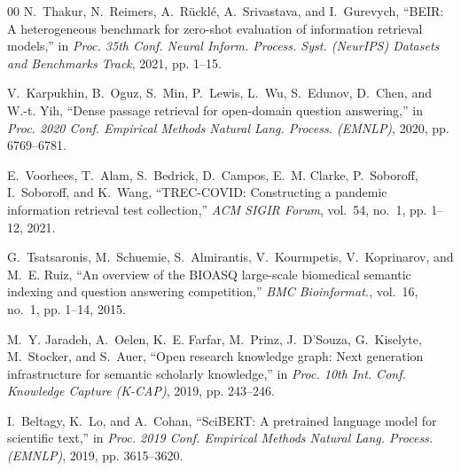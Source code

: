 \documentclass[conference]{IEEEtran}
\begin{document}
\begin{thebibliography}{00}
N.~Thakur, N.~Reimers, A.~R{\"{u}}ckl{\'{e}}, A.~Srivastava, and I.~Gurevych, ``BEIR: A heterogeneous benchmark for zero-shot evaluation of information retrieval models,'' in \emph{Proc. 35th Conf. Neural Inform. Process. Syst. (NeurIPS) Datasets and Benchmarks Track}, 2021, pp. 1--15.

V.~Karpukhin, B.~Oguz, S.~Min, P.~Lewis, L.~Wu, S.~Edunov, D.~Chen, and W.-t. Yih, ``Dense passage retrieval for open-domain question answering,'' in \emph{Proc. 2020 Conf. Empirical Methods Natural Lang. Process. (EMNLP)}, 2020, pp. 6769--6781.

E.~Voorhees, T.~Alam, S.~Bedrick, D.~Campos, E.~M. Clarke, P.~Soboroff, I.~Soboroff, and K.~Wang, ``TREC-COVID: Constructing a pandemic information retrieval test collection,'' \emph{ACM SIGIR Forum}, vol.~54, no.~1, pp. 1--12, 2021.

G.~Tsatsaronis, M.~Schuemie, S.~Almirantis, V.~Kourmpetis, V.~Koprinarov, and M.~E. Ruiz, ``An overview of the BIOASQ large-scale biomedical semantic indexing and question answering competition,'' \emph{BMC Bioinformat.}, vol.~16, no.~1, pp. 1--14, 2015.

M.~Y. Jaradeh, A.~Oelen, K.~E. Farfar, M.~Prinz, J.~D'Souza, G.~Kiselyte, M.~Stocker, and S.~Auer, ``Open research knowledge graph: Next generation infrastructure for semantic scholarly knowledge,'' in \emph{Proc. 10th Int. Conf. Knowledge Capture (K-CAP)}, 2019, pp. 243--246.

I.~Beltagy, K.~Lo, and A.~Cohan, ``SciBERT: A pretrained language model for scientific text,'' in \emph{Proc. 2019 Conf. Empirical Methods Natural Lang. Process. (EMNLP)}, 2019, pp. 3615--3620.

\end{thebibliography}
\end{document}
